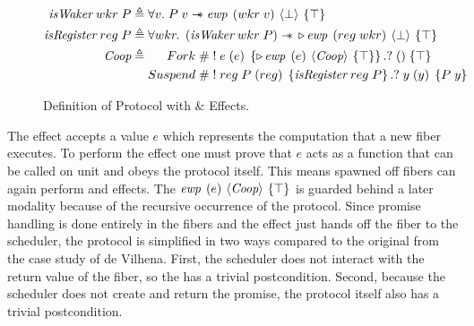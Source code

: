\begin{figure}[ht]
  \begin{align*}
    \gsIsWaker{}\; wkr\; P & \triangleq \forall v.   \;  P\; v \wand{} \ewp{wkr\; v}{\bot}{\top}                                                                       \\
    \gsIsReg{}\; reg\; P   & \triangleq \forall wkr. \; \left( \gsIsWaker{}\; wkr\; P \right) \wand{} \later \ewp{reg\; wkr}{\bot}{\top}                               \\
    \proto{}               & \triangleq \begin{aligned}[t]
                                          Fork\;    & \# \; !\; e\; (e)\; \left\{\later \ewp{e}{\proto{}}{\top}\right\}. ?\; ()\; \{ \top \}               \\
                                          Suspend\; & \# \; !\; reg\; P\; (reg)\; \left\{\gsIsReg{}\; reg\; P\right\}.?\; y\; (y)\; \left\{ P\; y \right\}
                                        \end{aligned}
  \end{align*}
  \caption{Definition of \proto{} Protocol with \efork{} \& \esuspend{} Effects.}
  \label{fig:coop-protocol-simpl}
\end{figure}

The \efork{} effect accepts a value \(e\) which represents the computation that a new fiber executes.
To perform the effect one must prove that \(e\) acts as a function that can be called on unit and obeys the \proto{} protocol itself.
This means spawned off fibers can again perform \efork{} and \esuspend{} effects.
The \(\ewp{e}{\proto{}}{\top}\) is guarded behind a later modality because of the recursive occurrence of the \proto{} protocol.
Since promise handling is done entirely in the fibers and the \efork{} effect just hands off the fiber to the scheduler, the protocol is simplified in two ways compared to the original from the case study of de Vilhena.
First, the scheduler does not interact with the return value of the fiber, so the \ewpt{} has a trivial postcondition.
Second, because the scheduler does not create and return the promise, the protocol itself also has a trivial postcondition.

